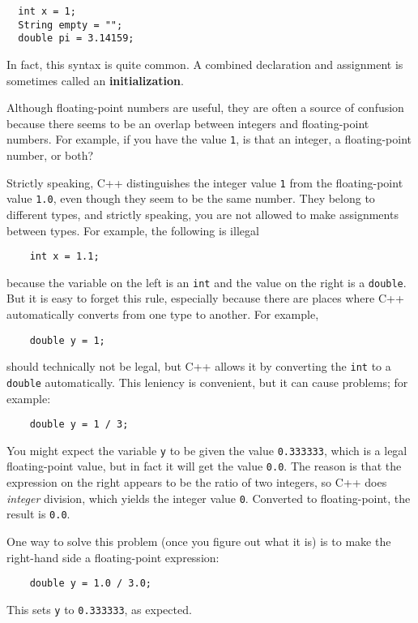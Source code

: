 \begin{verbatim}
  int x = 1;
  String empty = "";
  double pi = 3.14159;
\end{verbatim}
%
In fact, this syntax is quite common.  A combined declaration
and assignment is sometimes called an {\bf initialization}.


Although floating-point numbers are useful, they are
often a source of confusion because there seems to be an
overlap between integers and floating-point numbers.  For
example, if you have the value {\tt 1}, is that an integer,
a floating-point number, or both?

Strictly speaking, C++ distinguishes the integer value {\tt 1}
from the floating-point value {\tt 1.0}, even though they
seem to be the same number.  They belong to
different types, and strictly speaking, you are not allowed
to make assignments between types.  For example, the following
is illegal

\begin{verbatim}
    int x = 1.1;
\end{verbatim}
%
because the variable on the left is an {\tt int}
and the value on the right is a {\tt double}.  But it is easy
to forget this rule, especially because there are places where C++
automatically converts from one type to another.
For example,

\begin{verbatim}
    double y = 1;
\end{verbatim}
%
should technically not be legal, but C++ allows it by converting the
{\tt int} to a {\tt double} automatically.  This leniency is
convenient, but it can cause problems; for example:

\begin{verbatim}
    double y = 1 / 3;
\end{verbatim}
%
You might expect the variable {\tt y} to be given the value
{\tt 0.333333}, which is a legal floating-point value, but in
fact it will get the value {\tt 0.0}.  The reason is that the
expression on the right appears to be the ratio of two integers,
so C++ does {\em integer} division, which yields the integer
value {\tt 0}.  Converted to floating-point, the result is
{\tt 0.0}.

One way to solve this problem (once you figure out what
it is) is to make the right-hand side a floating-point
expression:

\begin{verbatim}
    double y = 1.0 / 3.0;
\end{verbatim}
%
This sets {\tt y} to {\tt 0.333333}, as expected.

